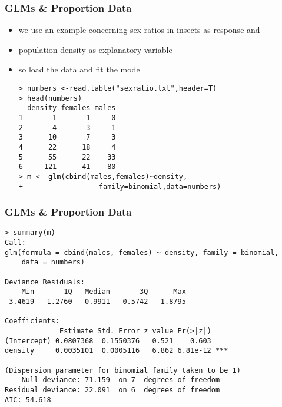 \begin{frame}[fragile]\frametitle{GLMs \& Proportion Data}
  \begin{itemize}
  \item we use an example concerning sex ratios in insects as response and
  \item population density as explanatory variable
  \item so load the data and fit the model
\begin{verbatim}
> numbers <-read.table("sexratio.txt",header=T)
> head(numbers)
  density females males
1       1       1     0
2       4       3     1
3      10       7     3
4      22      18     4
5      55      22    33
6     121      41    80
> m <- glm(cbind(males,females)~density,
+                  family=binomial,data=numbers)
\end{verbatim}
  \end{itemize}
\end{frame}

\begin{frame}[fragile]\frametitle{GLMs \& Proportion Data}\footnotesize
\begin{verbatim}
> summary(m)
Call:
glm(formula = cbind(males, females) ~ density, family = binomial, 
    data = numbers)

Deviance Residuals: 
    Min       1Q   Median       3Q      Max  
-3.4619  -1.2760  -0.9911   0.5742   1.8795  

Coefficients:
             Estimate Std. Error z value Pr(>|z|)    
(Intercept) 0.0807368  0.1550376   0.521    0.603    
density     0.0035101  0.0005116   6.862 6.81e-12 ***

(Dispersion parameter for binomial family taken to be 1)
    Null deviance: 71.159  on 7  degrees of freedom
Residual deviance: 22.091  on 6  degrees of freedom
AIC: 54.618
\end{verbatim}
\end{frame}

